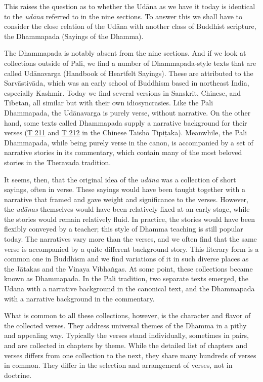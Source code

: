 \documentclass[12pt,openany]{book}%
\begin{document}
This raises the question as to whether the \textsanskrit{Udāna} as we have it today is identical to the \textit{\textsanskrit{udāna}} referred to in the nine sections. To answer this we shall have to consider the close relation of the \textsanskrit{Udāna} with another class of Buddhist scripture, the Dhammapada (Sayings of the Dhamma). 

The Dhammapada is notably absent from the nine sections. And if we look at collections outside of Pali, we find a number of Dhammapada-style texts that are called \textsanskrit{Udānavarga} (Handbook of Heartfelt Sayings). These are attributed to the \textsanskrit{Sarvāstivāda}, which was an early school of Buddhism based in northeast India, especially Kashmir. Today we find several versions in Sanskrit, Chinese, and Tibetan, all similar but with their own idiosyncrasies. Like the Pali Dhammapada, the \textsanskrit{Udānavarga} is purely verse, without narrative. On the other hand, some texts called Dhammapada supply a narrative background for their verses (\href{https://suttacentral.net/t211}{T 211} and \href{https://suttacentral.net/t212}{T 212} in the Chinese Taishō \textsanskrit{Tipiṭaka}). Meanwhile, the Pali Dhammapada, while being purely verse in the canon, is accompanied by a set of narrative stories in its commentary, which contain many of the most beloved stories in the Theravada tradition.

It seems, then, that the original idea of the \textit{\textsanskrit{udāna}} was a collection of short sayings, often in verse. These sayings would have been taught together with a narrative that framed and gave weight and significance to the verses. However, the \textit{\textsanskrit{udānas}} themselves would have been relatively fixed at an early stage, while the stories would remain relatively fluid. In practice, the stories would have been flexibly conveyed by a teacher; this style of Dhamma teaching is still popular today. The narratives vary more than the verses, and we often find that the same verse is accompanied by a quite different background story. This literary form is a common one in Buddhism and we find variations of it in such diverse places as the \textsanskrit{Jātakas} and the Vinaya \textsanskrit{Vibhaṅgas}. At some point, these collections became known as Dhammapada. In the Pali tradition, two separate texts emerged, the \textsanskrit{Udāna} with a narrative background in the canonical text, and the Dhammapada with a narrative background in the commentary. 

What is common to all these collections, however, is the character and flavor of the collected verses. They address universal themes of the Dhamma in a pithy and appealing way. Typically the verses stand individually, sometimes in pairs, and are collected in chapters by theme. While the detailed list of chapters and verses differs from one collection to the next, they share many hundreds of verses in common. They differ in the selection and arrangement of verses, not in doctrine.
\end{document}
